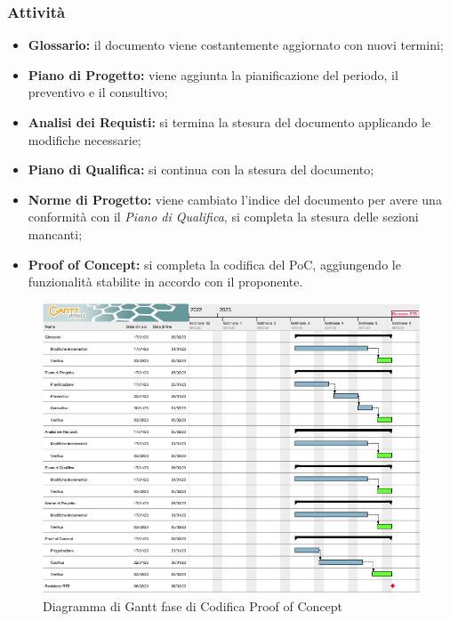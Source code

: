 \subsubsection{Attività}
\begin{itemize}
\item \textbf{Glossario:} il documento viene costantemente aggiornato con nuovi termini;
\item \textbf{Piano di Progetto:} viene aggiunta la pianificazione del periodo, il preventivo e il consultivo;  
\item \textbf{Analisi dei Requisti:} si termina la stesura del documento applicando le modifiche necessarie;
\item \textbf{Piano di Qualifica:} si continua con la stesura del documento;
\item \textbf{Norme di Progetto:} viene cambiato l'indice del documento per avere una conformità con il \textit{Piano di Qualifica}, 
si completa la stesura delle sezioni mancanti;
\item \textbf{Proof of Concept:} si completa la codifica del PoC, aggiungendo le funzionalità stabilite in accordo con il proponente.
\end{itemize}

\begin{figure}[H]
    \centering
    \includegraphics[scale=0.75]{image/gantt_terzo_periodo.png}
    \caption{Diagramma di Gantt fase di Codifica Proof of Concept}
\end{figure}
\pagebreak